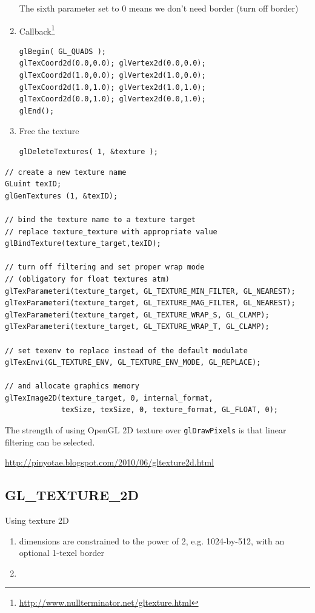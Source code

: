 \begin{enumerate}
The sixth parameter set to 0 means we don't need border (turn off border)

\item Callback\footnote{\url{http://www.nullterminator.net/gltexture.html}}
\begin{verbatim}
glBegin( GL_QUADS );
glTexCoord2d(0.0,0.0); glVertex2d(0.0,0.0);
glTexCoord2d(1.0,0.0); glVertex2d(1.0,0.0);
glTexCoord2d(1.0,1.0); glVertex2d(1.0,1.0);
glTexCoord2d(0.0,1.0); glVertex2d(0.0,1.0);
glEnd();
\end{verbatim}


\item Free the texture
\begin{verbatim}
glDeleteTextures( 1, &texture );
\end{verbatim}
\end{enumerate}

\begin{verbatim}
// create a new texture name
GLuint texID;
glGenTextures (1, &texID);

// bind the texture name to a texture target
// replace texture_texture with appropriate value
glBindTexture(texture_target,texID);

// turn off filtering and set proper wrap mode
// (obligatory for float textures atm)
glTexParameteri(texture_target, GL_TEXTURE_MIN_FILTER, GL_NEAREST);
glTexParameteri(texture_target, GL_TEXTURE_MAG_FILTER, GL_NEAREST);
glTexParameteri(texture_target, GL_TEXTURE_WRAP_S, GL_CLAMP);
glTexParameteri(texture_target, GL_TEXTURE_WRAP_T, GL_CLAMP);

// set texenv to replace instead of the default modulate
glTexEnvi(GL_TEXTURE_ENV, GL_TEXTURE_ENV_MODE, GL_REPLACE);

// and allocate graphics memory
glTexImage2D(texture_target, 0, internal_format,
             texSize, texSize, 0, texture_format, GL_FLOAT, 0);
\end{verbatim}


The strength of using OpenGL 2D texture over \verb!glDrawPixels! is
that linear filtering can be selected.

\url{http://pinyotae.blogspot.com/2010/06/gltexture2d.html}

\subsection{GL\_TEXTURE\_2D}
\label{sec:gl_texture_2d}

Using texture 2D
\begin{enumerate}
\item dimensions are constrained to the power of 2, e.g. 1024-by-512, 
with an optional 1-texel border

\item 
\end{enumerate}




